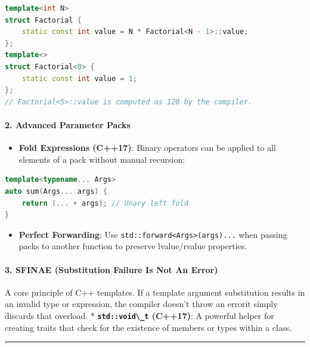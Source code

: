 \begin{lstlisting}[language={C++}]
template<int N>
struct Factorial {
    static const int value = N * Factorial<N - 1>::value;
};
template<>
struct Factorial<0> {
    static const int value = 1;
};
// Factorial<5>::value is computed as 120 by the compiler.
\end{lstlisting}

\hypertarget{advanced-parameter-packs}{%
\paragraph{2. Advanced Parameter Packs}\label{advanced-parameter-packs}}

\begin{itemize}
\tightlist
\item
  \textbf{Fold Expressions (C++17)}: Binary operators can be applied to
  all elements of a pack without manual recursion:
\end{itemize}

\begin{lstlisting}[language={C++}]
template<typename... Args>
auto sum(Args... args) {
    return (... + args); // Unary left fold
}
\end{lstlisting}

\begin{itemize}
\tightlist
\item
  \textbf{Perfect Forwarding}: Use
  \passthrough{\lstinline!std::forward<Args>(args)...!} when passing
  packs to another function to preserve lvalue/rvalue properties.
\end{itemize}

\hypertarget{sfinae-substitution-failure-is-not-an-error}{%
\paragraph{3. SFINAE (Substitution Failure Is Not An
Error)}\label{sfinae-substitution-failure-is-not-an-error}}

A core principle of C++ templates. If a template argument substitution
results in an invalid type or expression, the compiler doesn't throw an
errorit simply discards that overload. *
\textbf{\passthrough{\lstinline!std::void\_t!} (C++17)}: A powerful
helper for creating traits that check for the existence of members or
types within a class.

\begin{center}\rule{0.5\linewidth}{0.5pt}\end{center}

